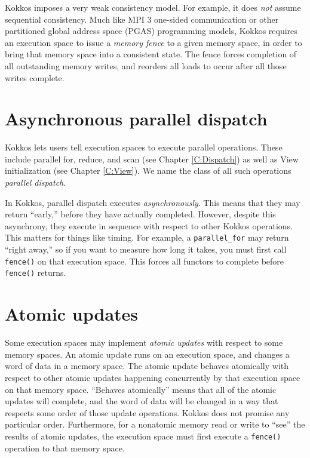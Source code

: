 Kokkos imposes a very weak consistency model.
For example, it does \emph{not} assume sequential consistency.
Much like MPI 3 one-sided communication
or other partitioned global address space (PGAS) programming models,
Kokkos requires an execution space to issue a \emph{memory fence}
to a given memory space, 
in order to bring that memory space into a consistent state.
The fence forces completion of all outstanding memory writes,
and reorders all loads to occur after all those writes complete.

\section{Asynchronous parallel dispatch}\label{S:Model:Async}

Kokkos lets users tell execution spaces to execute parallel operations.
These include parallel for, reduce, and scan (see Chapter \ref{C:Dispatch})
as well as View initialization (see Chapter \ref{C:View}).
We name the class of all such operations \emph{parallel dispatch}.

In Kokkos, parallel dispatch executes \emph{asynchronously}.  
This means that they may return ``early,'' before they have actually completed.
However, despite this asynchrony,
they execute in sequence with respect to other Kokkos operations.
This matters for things like timing.
For example, a \lstinline!parallel_for! may return ``right away,''
so if you want to measure how long it takes,
you must first call \lstinline!fence()! on that execution space.
This forces all functors to complete before \lstinline!fence()! returns.

\section{Atomic updates}\label{S:Model:Atomic}

Some execution spaces may implement \emph{atomic updates} with respect to some memory spaces.
An atomic update runs on an execution space, and changes a word of data in a memory space.
The atomic update behaves atomically with respect to other atomic updates happening concurrently by that execution space on that memory space.
``Behaves atomically'' means that all of the atomic updates will complete,
and the word of data will be changed in a way that respects some order of those update operations.
Kokkos does not promise any particular order.
Furthermore, for a nonatomic memory read or write to ``see'' the results of atomic updates,
the execution space must first execute a \lstinline!fence()! operation to that memory space.








